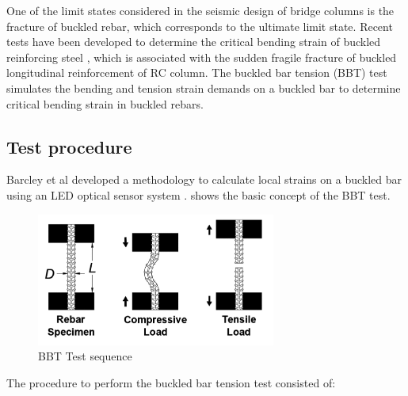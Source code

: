 One of the limit states considered in the seismic design of bridge columns is the fracture of buckled rebar, which corresponds to the ultimate limit state. Recent tests have been developed to determine the critical bending strain of buckled reinforcing steel \cite{Barcley2019}, which is associated with the sudden fragile fracture of buckled longitudinal reinforcement of RC column. The buckled bar tension (BBT) test simulates the bending and tension strain demands on a buckled bar to determine critical bending strain in buckled rebars. 

\subsection{Test procedure}
Barcley et al \cite{Barcley2019} developed a methodology to calculate local strains on a buckled bar using an LED optical sensor system \cite{NorthernDigitalInc.2020}.  shows the basic concept of the BBT test.

\begin{figure}[htbp]
	\centering
	\includegraphics[width=0.7\textwidth]{Chapter-3/figs/BBT_Sequence}
	\caption{BBT Test sequence\cite{Barcley2019}}
	\label{fig:BBTseq}
\end{figure}

The procedure to perform the buckled bar tension test consisted of:

